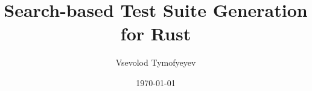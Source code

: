 \documentclass[paper=a4,%
  twoside,%
  BCOR4mm,%
  abstract=true,%
  toc=bibliography,%
  chapterprefix=true,%
  toc=bibliographynumbered,%
  open=right,%
  english,%
  pagesize=pdftex]{scrreprt}
\newcommand{\authorname}{Vsevolod Tymofyeyev}
\newcommand{\thesistitle}{Search-based Test Suite Generation for Rust}
\begin{document}
\frontmatter
\subject{\normalfont~\\[0.5cm]
  ~\\[1.5cm]
  Master's Thesis in Computer Science}
\title{\normalfont \thesistitle{}}
\author{\authorname{}}
\date{\today}
\publishers{Examiners:\\{Prof. Dr. Gordon Fraser}\\
  {\large (Chair of Software Engineering II)}\\[2ex]
  {Prof. Dr. Christian Hammer}\\
  {\large (Chair of Software Engineering I)}
  }
\lowertitleback{~\\
  \textbf{\authorname{}}:\\
  \emph{\thesistitle{}}\\
  Master's Thesis, University of Passau, 2022.
}
\maketitle

\begin{abstract}
  \blindtext
\end{abstract}
\cleardoublepage
\tableofcontents

\mainmatter%
\end{document}
